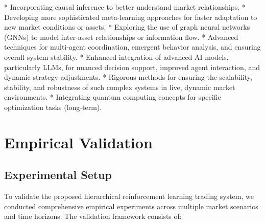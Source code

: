 \documentclass[11pt]{article}
\begin{document}
    *   Incorporating causal inference to better understand market relationships.
    *   Developing more sophisticated meta-learning approaches for faster adaptation to new market conditions or assets.
    *   Exploring the use of graph neural networks (GNNs) to model inter-asset relationships or information flow.
    *   Advanced techniques for multi-agent coordination, emergent behavior analysis, and ensuring overall system stability.
    *   Enhanced integration of advanced AI models, particularly LLMs, for nuanced decision support, improved agent interaction, and dynamic strategy adjustments.
    *   Rigorous methods for ensuring the scalability, stability, and robustness of such complex systems in live, dynamic market environments.
    *   Integrating quantum computing concepts for specific optimization tasks (long-term).


\section{Empirical Validation}

\subsection{Experimental Setup}

To validate the proposed hierarchical reinforcement learning trading system, we conducted comprehensive empirical experiments across multiple market scenarios and time horizons. The validation framework consists of:
\end{document}
